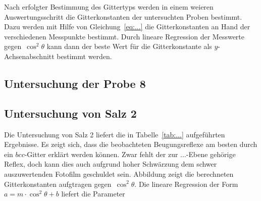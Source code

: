 Nach erfolgter Bestimmung des Gittertyps werden in einem weieren
Auswertungsschritt die Gitterkonstanten der untersuchten Proben bestimmt. Dazu
werden mit Hilfe von Gleichung~\eqref{eq:...} die Gitterkonstanten an Hand der
verschiedenen Messpunkte bestimmt. Durch lineare Regression der Messwerte
gegen~$\cos^2{\theta}$ kann dann der beste Wert für die Gitterkonstante als
$y$-Achsenabschnitt bestimmt werden.

\subsection{Untersuchung der Probe 8}

\subsection{Untersuchung von Salz 2}

Die Untersuchung von Salz 2 liefert die in Tabelle~\ref{tab:...}
aufgeführten Ergebnisse. Es zeigt sich, dass die beobachteten Beugungsreflexe
am besten durch ein $bcc$-Gitter erklärt werden können. Zwar fehlt der zur
$...$-Ebene gehörige Reflex, doch kann dies auch aufgrund hoher Schwärzung dem
schwer auszuwertenden Fotofilm geschuldet sein. Abbildung zeigt die berechneten
Gitterkonstanten aufgtragen gegen~$\cos^2{\theta}$. Die lineare Regression
der Form~$a=m\cdot\cos^2{\theta}+b$ liefert die Parameter

